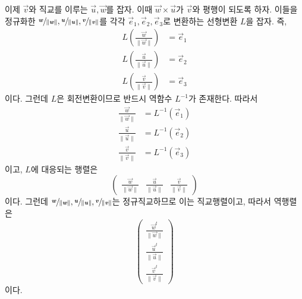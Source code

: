\documentclass[sections/engineering_mathematics_lecture_note.tex]{subfiles}
\begin{document}
\begin{remark}
    이제 $\vec v$와 직교를 이루는 $\vec u, \vec w$를 잡자.
    이때 $\vec w \times \vec u$가 $\vec v$와 평행이 되도록 하자.
    이들을 정규화한 $\sfrac{\bm{\mathit{w}}}{\lVert \bm{\mathit{w}} \rVert}, \sfrac{\bm{\mathit{u}}}{\lVert \bm{\mathit{u}} \rVert}, \sfrac{\bm{\mathit{v}}}{\lVert \bm{\mathit{v}} \rVert}$를 각각 $\vec e_1, \vec e_2, \vec e_3$로 변환하는 선형변환 $L$을 잡자.
    즉,
    \begin{align*}
        L\left(\frac{\vec w}{\lVert \vec w \rVert}\right) &= \vec e_1\\
        L\left(\frac{\vec u}{\lVert \vec u \rVert}\right) &= \vec e_2\\
        L\left(\frac{\vec v}{\lVert \vec v \rVert}\right) &= \vec e_3
    \end{align*}
    이다.
    그런데 $L$은 회전변환이므로 반드시 역함수 $L^{-1}$가 존재한다.
    따라서
    \begin{align*}
        \frac{\vec w}{\lVert \vec w \rVert} &= L^{-1}(\vec e_1)\\
        \frac{\vec u}{\lVert \vec u \rVert} &= L^{-1}(\vec e_2)\\
        \frac{\vec v}{\lVert \vec v \rVert} &= L^{-1}(\vec e_3)
    \end{align*}
    이고, $L$에 대응되는 행렬은 
    \begin{equation*}
        \begin{pmatrix}
            \frac{\vec w}{\lVert \vec w \rVert} & \frac{\vec u}{\lVert \vec u \rVert} & \frac{\vec v}{\lVert \vec v \rVert}
        \end{pmatrix}
    \end{equation*}
    이다.
    그런데 $\sfrac{\bm{\mathit{w}}}{\lVert \bm{\mathit{w}} \rVert}, \sfrac{\bm{\mathit{u}}}{\lVert \bm{\mathit{u}} \rVert}, \sfrac{\bm{\mathit{v}}}{\lVert \bm{\mathit{v}} \rVert}$는 정규직교하므로 이는 직교행렬이고, 따라서 역행렬은
    \begin{equation*}
        \begin{pmatrix}
            \frac{\vec w^t}{\lVert \vec w \rVert} \\ \frac{\vec u^t}{\lVert \vec u \rVert} \\ \frac{\vec v^t}{\lVert \vec v \rVert}
        \end{pmatrix}
    \end{equation*}
    이다.


\end{remark}
\end{document}
